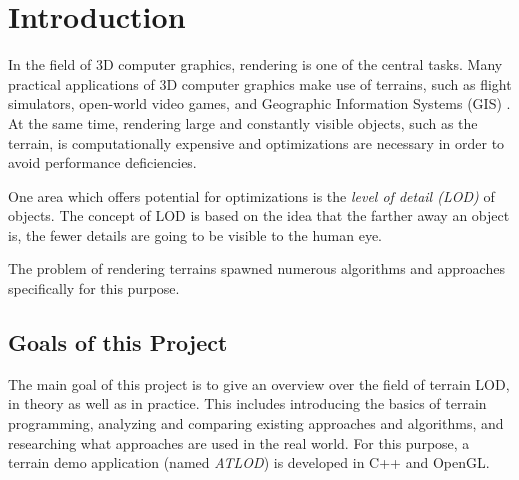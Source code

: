 \chapter{Introduction}
In the field of 3D computer graphics, rendering is one of the central tasks.
Many practical applications of 3D computer graphics make use of terrains, 
such as flight simulators, open-world video games, and Geographic Information Systems (GIS) \cite[p.~185]{lodfor3dgraphics}.
At the same time, rendering large and constantly visible objects, such as the terrain, is computationally expensive 
and optimizations are necessary in order to avoid performance deficiencies.

One area which offers potential for optimizations is the \textit{level of detail (LOD)} of objects.
The concept of LOD is based on the idea that the farther away an object is, the fewer details are going to be visible to the human eye.

The problem of rendering terrains spawned numerous algorithms and approaches specifically
for this purpose. 

\section{Goals of this Project}
The main goal of this project is to give an overview over the field of 
terrain LOD, in theory as well as in practice. 
This includes introducing the basics of terrain programming,
analyzing and comparing existing approaches and algorithms, and
researching what approaches are used in the real world.
For this purpose, a terrain demo application (named \textit{ATLOD}) is developed
in C++ and OpenGL.


